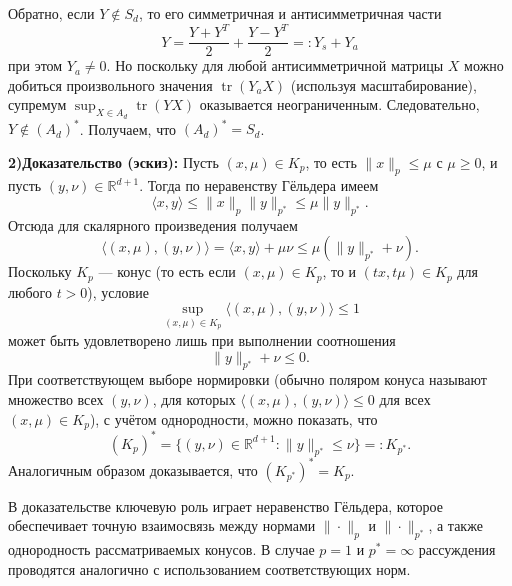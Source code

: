 \documentclass[12pt]{article}
\begin{document}
	Обратно, если $Y\not\in S_d$, то его симметричная и антисимметричная части
	\[
	Y=\frac{Y+Y^T}{2}+\frac{Y-Y^T}{2}=: Y_s + Y_a
	\]
	при этом $Y_a\neq 0$. Но поскольку для любой антисимметричной матрицы $X$ можно добиться произвольного значения $\operatorname{tr}(Y_aX)$ (используя масштабирование), супремум $\sup_{X\in A_d}\operatorname{tr}(YX)$ оказывается неограниченным. Следовательно, $Y\not\in (A_d)^*$. Получаем, что $(A_d)^*=S_d$.
	

	\medskip
	\textbf{2)Доказательство (эскиз):}  
	Пусть $(x,\mu)\in K_p$, то есть $\|x\|_p\le \mu$ с $\mu\ge 0$, и пусть $(y,\nu)\in\mathbb{R}^{d+1}$. Тогда по неравенству Гёльдера имеем
	\[
	\langle x,y\rangle\le \|x\|_p \|y\|_{p^*}\le \mu \|y\|_{p^*}.
	\]
	Отсюда для скалярного произведения получаем
	\[
	\langle (x,\mu), (y,\nu) \rangle = \langle x,y\rangle+\mu\nu \le \mu(\|y\|_{p^*}+\nu).
	\]
	Поскольку $K_p$ --- конус (то есть если $(x,\mu)\in K_p$, то и $(tx,t\mu)\in K_p$ для любого $t>0$), условие
	\[
	\sup_{(x,\mu)\in K_p} \langle (x,\mu), (y,\nu) \rangle \le 1
	\]
	может быть удовлетворено лишь при выполнении соотношения
	\[
	\|y\|_{p^*}+\nu\le 0.
	\]
	При соответствующем выборе нормировки (обычно поляром конуса называют множество всех $(y,\nu)$, для которых $\langle (x,\mu), (y,\nu) \rangle\le 0$ для всех $(x,\mu)\in K_p$), с учётом однородности, можно показать, что
	\[
	(K_p)^* = \{ (y,\nu)\in\mathbb{R}^{d+1} : \|y\|_{p^*}\le \nu \} =: K_{p^*}.
	\]
	Аналогичным образом доказывается, что $(K_{p^*})^* = K_p$.
	
	В доказательстве ключевую роль играет неравенство Гёльдера, которое обеспечивает точную взаимосвязь между нормами $\|\cdot\|_p$ и $\|\cdot\|_{p^*}$, а также однородность рассматриваемых конусов. В случае $p=1$ и $p^*=\infty$ рассуждения проводятся аналогично с использованием соответствующих норм.
	
	
\end{document}
